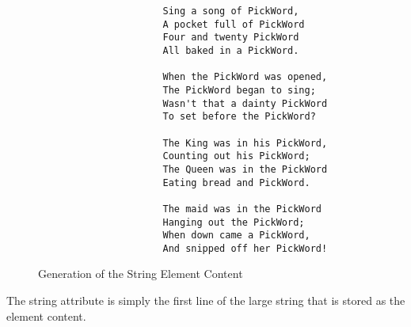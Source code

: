 \begin {center}
\renewcommand{\baselinestretch}{1.1}
\begin {figure}
\begin{small}
\begin{verbatim}
                      Sing a song of PickWord,
                      A pocket full of PickWord
                      Four and twenty PickWord
                      All baked in a PickWord.

                      When the PickWord was opened,
                      The PickWord began to sing;
                      Wasn't that a dainty PickWord
                      To set before the PickWord?

                      The King was in his PickWord,
                      Counting out his PickWord;
                      The Queen was in the PickWord
                      Eating bread and PickWord.

                      The maid was in the PickWord
                      Hanging out the PickWord;
                      When down came a PickWord,
                      And snipped off her PickWord!
\end{verbatim}
\end{small}
\caption{Generation of the String Element Content}
\label{fig:large-str-gen}
\end {figure}
\renewcommand{\baselinestretch}{\cheatbaseline}
\end {center}


The string attribute is simply the first line of the large string that
is stored as the element content.
